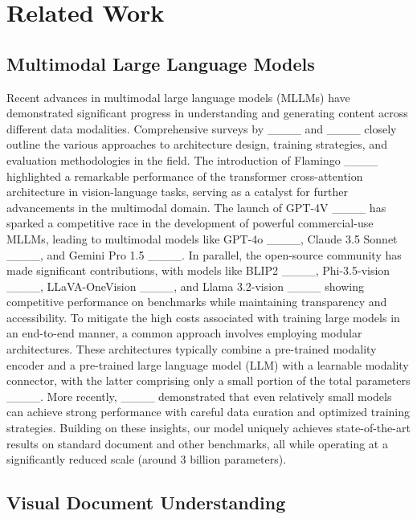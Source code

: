 \section{Related Work}
\subsection{Multimodal Large Language Models}

Recent advances in multimodal large language models (MLLMs) have demonstrated significant progress in understanding and generating content across different data modalities. Comprehensive surveys by ____ and ____ closely outline the various approaches to architecture design, training strategies, and evaluation methodologies in the field. 
The introduction of Flamingo ____ highlighted a remarkable performance of the transformer cross-attention architecture in vision-language tasks, serving as a catalyst for further advancements in the multimodal domain. The launch of GPT-4V ____ has sparked a competitive race in the development of powerful commercial-use MLLMs, leading to multimodal models like GPT-4o ____, Claude 3.5 Sonnet ____, and Gemini Pro 1.5 ____. In parallel, the open-source community has made significant contributions, with models like BLIP2 ____, Phi-3.5-vision ____, LLaVA-OneVision ____, and Llama 3.2-vision ____ showing competitive performance on benchmarks while maintaining transparency and accessibility.
To mitigate the high costs associated with training large models in an end-to-end manner, a common approach involves employing modular architectures. These architectures typically combine a pre-trained modality encoder and a pre-trained large language model (LLM) with a learnable modality connector, with the latter comprising only a small portion of the total parameters ____. 
More recently, ____ demonstrated that even relatively small models can achieve strong performance with careful data curation and optimized training strategies.
Building on these insights, our model uniquely achieves state-of-the-art results on standard document and other benchmarks, all while operating at a significantly reduced scale (around 3 billion parameters). 

\subsection{Visual Document Understanding}

